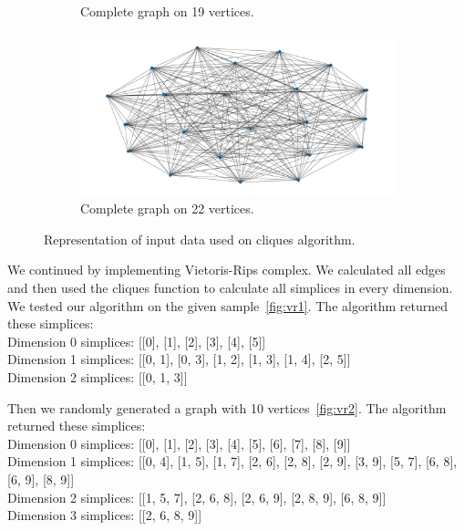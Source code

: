 \documentclass{article}
\begin{document}
\begin{figure}[H]
\begin{subfigure}{0.495\linewidth}
        \caption{Complete graph on 19 vertices.}\label{fig:g19}
    \end{subfigure}
    \begin{subfigure}{0.495\linewidth}
        \centering
        \includegraphics[width=\textwidth]{g22.png}
        \caption{Complete graph on 22 vertices.}\label{fig:g22}
    \end{subfigure}
    \caption{Representation of input data used on cliques algorithm.}\label{fig:cliquesGraphs}
\end{figure}

We continued by implementing Vietoris-Rips complex. We calculated all edges and then used the cliques function to calculate all simplices in every dimension. We tested our algorithm on the given sample~\ref{fig:vr1}. The algorithm returned these simplices:\\
Dimension 0 simplices: [[0], [1], [2], [3], [4], [5]]\\
Dimension 1 simplices: [[0, 1], [0, 3], [1, 2], [1, 3], [1, 4], [2, 5]]\\
Dimension 2 simplices: [[0, 1, 3]]

Then we randomly generated a graph with 10 vertices~\ref{fig:vr2}. The algorithm returned these simplices:\\
Dimension 0 simplices: [[0], [1], [2], [3], [4], [5], [6], [7], [8], [9]]\\
Dimension 1 simplices: [[0, 4], [1, 5], [1, 7], [2, 6], [2, 8], [2, 9], [3, 9], [5, 7], [6, 8], [6, 9], [8, 9]]\\
Dimension 2 simplices: [[1, 5, 7], [2, 6, 8], [2, 6, 9], [2, 8, 9], [6, 8, 9]]\\
Dimension 3 simplices: [[2, 6, 8, 9]]
\end{document}
